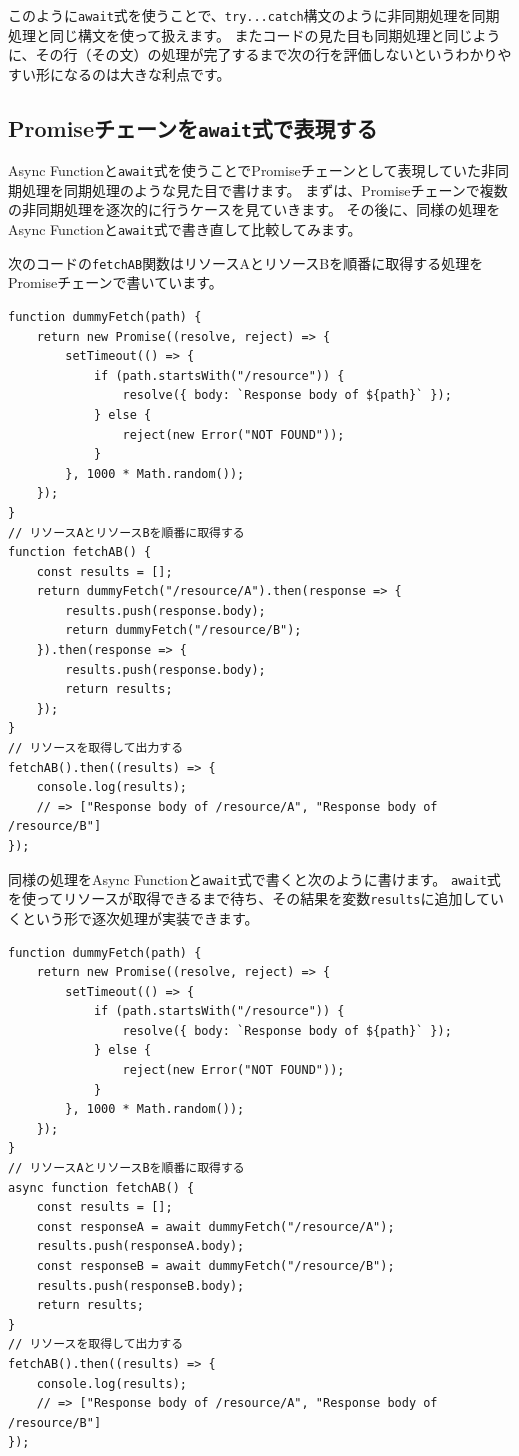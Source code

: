 このように\texttt{await}式を使うことで、\texttt{try...catch}構文のように非同期処理を同期処理と同じ構文を使って扱えます。
またコードの見た目も同期処理と同じように、その行（その文）の処理が完了するまで次の行を評価しないというわかりやすい形になるのは大きな利点です。

\hypertarget{promise-chain-to-async-function}{%
\subsection{\texorpdfstring{Promiseチェーンを\texttt{await}式で表現する}{Promiseチェーンをawait式で表現する}}\label{promise-chain-to-async-function}}

Async
Functionと\texttt{await}式を使うことでPromiseチェーンとして表現していた非同期処理を同期処理のような見た目で書けます。
まずは、Promiseチェーンで複数の非同期処理を逐次的に行うケースを見ていきます。
その後に、同様の処理をAsync
Functionと\texttt{await}式で書き直して比較してみます。

次のコードの\texttt{fetchAB}関数はリソースAとリソースBを順番に取得する処理をPromiseチェーンで書いています。

\begin{lstlisting}
function dummyFetch(path) {
    return new Promise((resolve, reject) => {
        setTimeout(() => {
            if (path.startsWith("/resource")) {
                resolve({ body: `Response body of ${path}` });
            } else {
                reject(new Error("NOT FOUND"));
            }
        }, 1000 * Math.random());
    });
}
// リソースAとリソースBを順番に取得する
function fetchAB() {
    const results = [];
    return dummyFetch("/resource/A").then(response => {
        results.push(response.body);
        return dummyFetch("/resource/B");
    }).then(response => {
        results.push(response.body);
        return results;
    });
}
// リソースを取得して出力する
fetchAB().then((results) => {
    console.log(results); 
    // => ["Response body of /resource/A", "Response body of /resource/B"]
});
\end{lstlisting}

同様の処理をAsync
Functionと\texttt{await}式で書くと次のように書けます。
\texttt{await}式を使ってリソースが取得できるまで待ち、その結果を変数\texttt{results}に追加していくという形で逐次処理が実装できます。

\begin{lstlisting}
function dummyFetch(path) {
    return new Promise((resolve, reject) => {
        setTimeout(() => {
            if (path.startsWith("/resource")) {
                resolve({ body: `Response body of ${path}` });
            } else {
                reject(new Error("NOT FOUND"));
            }
        }, 1000 * Math.random());
    });
}
// リソースAとリソースBを順番に取得する
async function fetchAB() {
    const results = [];
    const responseA = await dummyFetch("/resource/A");
    results.push(responseA.body);
    const responseB = await dummyFetch("/resource/B");
    results.push(responseB.body);
    return results;
}
// リソースを取得して出力する
fetchAB().then((results) => {
    console.log(results); 
    // => ["Response body of /resource/A", "Response body of /resource/B"]
});
\end{lstlisting}

